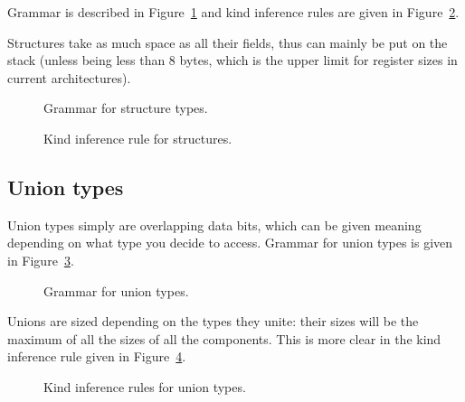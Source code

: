 Grammar is described in Figure~\ref{fig:nstar-common-ts-structs-syntax} and kind inference rules are given in Figure~\ref{fig:nstar-common-ts-structs-kindrules}.

Structures take as much space as all their fields, thus can mainly be put on the stack (unless being less than 8 bytes, which is the upper limit for register sizes in current architectures).

\begin{figure}[htb]
  \centering

  \caption{Grammar for structure types.}
  \label{fig:nstar-common-ts-structs-syntax}
\end{figure}

\begin{figure}[H]
  \centering
  \begin{prooftree}
  \end{prooftree}

  \caption{Kind inference rule for structures.}
  \label{fig:nstar-common-ts-structs-kindrules}
\end{figure}

\subsection{Union types}\label{subsec:nstar-common-ts-unions}

Union types simply are overlapping data bits, which can be given meaning depending on what type you decide to access.
Grammar for union types is given in Figure~\ref{fig:nstar-common-ts-unions-syntax}.

\begin{figure}[htb]
  \centering

  \caption{Grammar for union types.}
  \label{fig:nstar-common-ts-unions-syntax}
\end{figure}

Unions are sized depending on the types they unite: their sizes will be the maximum of all the sizes of all the components.
This is more clear in the kind inference rule given in Figure~\ref{fig:nstar-common-ts-unions-kindrules}.

\begin{figure}[H]
  \centering

  \begin{prooftree}
  \end{prooftree}

  \caption{Kind inference rules for union types.}
  \label{fig:nstar-common-ts-unions-kindrules}
\end{figure}

